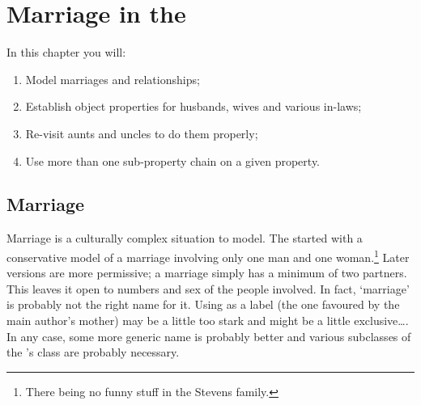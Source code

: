 \chapter{Marriage in the \fhkb}
\label{chap:marriage}

In this chapter you will:
\begin{enumerate}
\item Model marriages and relationships;
\item Establish object properties for husbands, wives and various in-laws;
\item Re-visit aunts and uncles to do them properly;
\item Use more than one sub-property chain on a given property.
\end{enumerate}



\section{Marriage}

Marriage is a culturally complex situation to model. The \fhkb started with a conservative model of a marriage involving only one man and one woman.\footnote{There being no funny stuff in the Stevens family.} Later versions are more permissive; a marriage simply has a minimum of two partners. This leaves it open to numbers and sex of the people involved. In fact, `marriage' is probably not the right name for it. Using  as a label (the one favoured by the main author's mother) may be a little too stark and might be a little exclusive\ldots. In any case, some more generic name is probably better and various subclasses of the \fhkb's  class are probably necessary.

